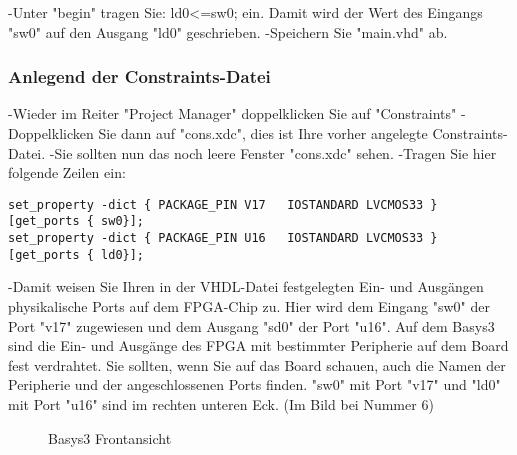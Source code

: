 \documentclass{article}
\begin{document}
-Unter "begin" tragen Sie:\newline
ld0<=sw0;\newline
ein. Damit wird der Wert des Eingangs "sw0" auf den Ausgang "ld0" geschrieben.\newline
-Speichern Sie "main.vhd" ab.\newline

\subsubsection{Anlegend der Constraints-Datei}
-Wieder im Reiter "Project Manager" doppelklicken Sie auf "Constraints"\newline
-Doppelklicken Sie dann auf "cons.xdc", dies ist Ihre vorher angelegte Constraints-Datei.\newline
-Sie sollten nun das noch leere Fenster "cons.xdc" sehen.\newline
-Tragen Sie hier folgende Zeilen ein:
\begin{verbatim}
set_property -dict { PACKAGE_PIN V17   IOSTANDARD LVCMOS33 } [get_ports { sw0}];
set_property -dict { PACKAGE_PIN U16   IOSTANDARD LVCMOS33 } [get_ports { ld0}];
\end{verbatim}
-Damit weisen Sie Ihren in der VHDL-Datei festgelegten Ein- und Ausgängen physikalische Ports auf dem FPGA-Chip zu. Hier wird dem Eingang "sw0" der Port "v17" zugewiesen und dem Ausgang "sd0" der Port "u16". Auf dem Basys3 sind die Ein- und Ausg\"ange des FPGA mit bestimmter Peripherie auf dem Board fest verdrahtet. Sie sollten, wenn Sie auf das Board schauen, auch die Namen der Peripherie und der angeschlossenen Ports finden. "sw0" mit Port "v17" und "ld0" mit Port "u16" sind im rechten unteren Eck. (Im Bild bei Nummer 6)\newline

\begin{figure}[H]
\begin{center}
\caption{Basys3 Frontansicht}
\end{center}
\end{figure}
\end{document}
